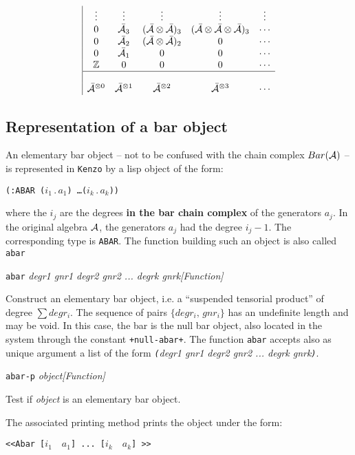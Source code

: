 $$\begin{array}{|ccccc}
              \vdots & \vdots & \vdots &\vdots & \vdots \\
              0 & \bar{\cal A}_3 & (\bar{\cal A} \otimes \bar{\cal A})_3 & 
             (\bar{\cal A}\otimes \bar{\cal A}\otimes\bar{\cal A})_3 & \cdots \\
              0 & \bar{\cal A}_2 & (\bar{\cal A}\otimes\bar{\cal A})_2 & 0 & \cdots \\
              0 & \bar{\cal A}_1 & 0 & 0 & \cdots \\
              {{\Bbb Z}} & 0 & 0 & 0 & \cdots \\ \hline
                   &   &   &   &    \\
             \bar{\cal A}^{\otimes 0} & \bar{\cal A}^{\otimes 1} & \bar{\cal A}^{\otimes 2} &
             \bar{\cal A}^{\otimes 3} & \cdots 
\end{array} $$

\subsection {Representation of a bar object}

An elementary bar object 
-- not to be confused with the chain complex $Bar({\cal A})$ --
is represented in {\tt Kenzo} by a lisp object of the form:

\begin{center} {\tt (:ABAR  ($i_1\, . \, a_1$) \ldots ($i_k\, . \, a_k$))} \end{center}
where the $i_j$ are the degrees {\bf in the bar chain complex} of the generators $a_j$.
In the original algebra $\cal A$, the generators $a_j$ had the degree $i_j-1$.
The corresponding type is {\tt ABAR}.
The function  building such an object is also called {\tt abar}
\vskip 0.35cm
{\parindent=0mm
{\leftskip=5mm 
{\tt abar} {\em  degr1 gnr1 degr2 gnr2 ... degrk gnrk}\hfill {\em [Function]} \par}
{\leftskip=15mm 
Construct an elementary bar object, i.e. a ``suspended tensorial product'' of degree $\sum degr_i$. The sequence of pairs
$\lbrace degr_i,\,  gnr_i \rbrace$ has an undefinite length and  may be void. In this case,  the bar
is the null bar object, also located in the system through the constant {\tt +null-abar+}. The function
{\tt abar} accepts also as unique argument a list of the form
{\em  {\tt (}degr1 gnr1 degr2 gnr2 ... degrk gnrk{\tt )}}.   \par}
{\leftskip=5mm 
{\tt abar-p} {\em object}\hfill {\em [Function]} \par}
{\leftskip=15mm 
Test if {\em object} is an elementary bar object. \par}
}
\vskip 0.35cm
The associated printing  method prints the object under the form:
\begin{center} 
{\tt <<Abar [$i_1\quad a_1$] ... [$i_k\quad a_k$] >>}
\end{center}

